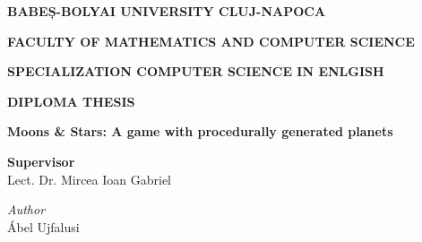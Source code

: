 \documentclass[12pt]{report}
\begin{document}
\begin{titlepage}
    \centering

    {\large \textbf{BABEȘ-BOLYAI UNIVERSITY CLUJ-NAPOCA}\par}
    {\large \textbf{FACULTY OF MATHEMATICS AND COMPUTER SCIENCE}\par}
    {\large \textbf{SPECIALIZATION COMPUTER SCIENCE IN ENLGISH}\par}

    \vspace{4cm}

    {\Huge \textbf{DIPLOMA THESIS}\par}

    \vspace{2cm}

    {\LARGE \textbf{Moons \& Stars: A game with procedurally generated planets}\par}

    \vfill

    \begin{flushleft}
        \large \textbf{Supervisor}\\
        Lect. Dr. Mircea Ioan Gabriel
    \end{flushleft}

    \vspace{1cm}

    \begin{flushright}
        \large \textit{Author}\\
        Ábel Ujfalusi
    \end{flushright}

\end{titlepage}
\newpage
\end{document}
